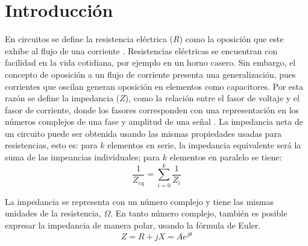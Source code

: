 \documentclass[fleqn,11pt]{SelfArx}
\begin{document}
	\flushbottom %
	
	\maketitle %
	
	
	\thispagestyle{empty} %
	\renewcommand{\tablename}{Tabla} 
	
	
	
	\section*{Introducci\'on}
	En circuitos se define la resistencia el\'ectrica ($R$) como la oposici\'on que este exhibe al flujo de una corriente \cite{alexander2009fundamentals}. Resistencias el\'ectricas se encuentran con facilidad en la vida cotidiana, por ejemplo en un horno casero. Sin embargo, el concepto de oposici\'on a un flujo de corriente presenta una generalizaci\'on, pues corrientes que oscilan generan oposici\'on en elementos como capacitores. Por esta raz\'on se define la impedancia ($Z$), como la relaci\'on entre el fasor de voltaje y el fasor de corriente, donde los fasores corresponden con una representaci\'on en los n\'umeros complejos de una fase y amplitud de una se\~nal \cite{alexander2009fundamentals}. La impedancia neta de un circuito puede ser obtenida usando las mismas propiedades usadas para resistencias, esto es: para $k$ elementos en serie, la impedancia equivalente ser\'a la suma de las impeancias individuales; para $k$ elementos en paralelo se tiene:
	\begin{equation}
		\dfrac{1}{Z_{eq}} = \sum\limits_{i=0}^{k}\dfrac{1}{Z_i}
	\end{equation}
	
	La impedancia se representa con un n\'umero complejo y tiene las mismas unidades de la resistencia, $\Omega$. En tanto n\'umero complejo, tambi\'en es posible expresar la impedancia de manera polar, usando la f\'ormula de Euler.
	\begin{equation}
		Z = R + jX = Ae^{j\theta}
	\end{equation}
	
\end{document}
